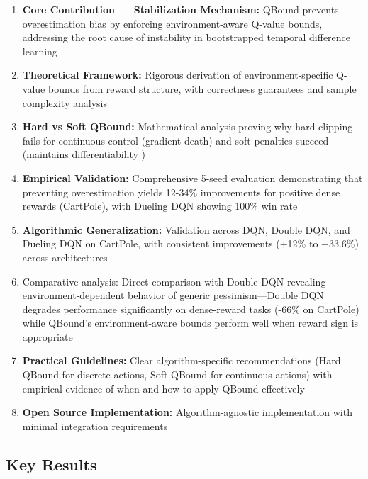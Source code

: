 \documentclass[11pt]{article}
\theoremstyle{definition}
\theoremstyle{remark}
\begin{document}
\begin{enumerate}
    \item \textbf{Core Contribution — Stabilization Mechanism:} QBound prevents overestimation bias \citep{thrun1993issues, van2016deep} by enforcing environment-aware Q-value bounds, addressing the root cause of instability in bootstrapped temporal difference learning \citep{sutton2018reinforcement}
    \item \textbf{Theoretical Framework:} Rigorous derivation of environment-specific Q-value bounds from reward structure, with correctness guarantees and sample complexity analysis
    \item \textbf{Hard vs Soft QBound:} Mathematical analysis proving why hard clipping fails for continuous control (gradient death) and soft penalties succeed (maintains differentiability \citep{silver2014deterministic})
    \item \textbf{Empirical Validation:} Comprehensive 5-seed evaluation demonstrating that preventing overestimation yields 12-34\% improvements for positive dense rewards (CartPole), with Dueling DQN showing 100\% win rate
    \item \textbf{Algorithmic Generalization:} Validation across DQN, Double DQN, and Dueling DQN on CartPole, with consistent improvements (+12\% to +33.6\%) across architectures
    \item Comparative analysis: Direct comparison with Double DQN revealing environment-dependent behavior of generic pessimism—Double DQN degrades performance significantly on dense-reward tasks (-66\% on CartPole) while QBound's environment-aware bounds perform well when reward sign is appropriate
    \item \textbf{Practical Guidelines:} Clear algorithm-specific recommendations (Hard QBound for discrete actions, Soft QBound for continuous actions) with empirical evidence of when and how to apply QBound effectively
    \item \textbf{Open Source Implementation:} Algorithm-agnostic implementation with minimal integration requirements
\end{enumerate}

\subsection{Key Results}
\end{document}
